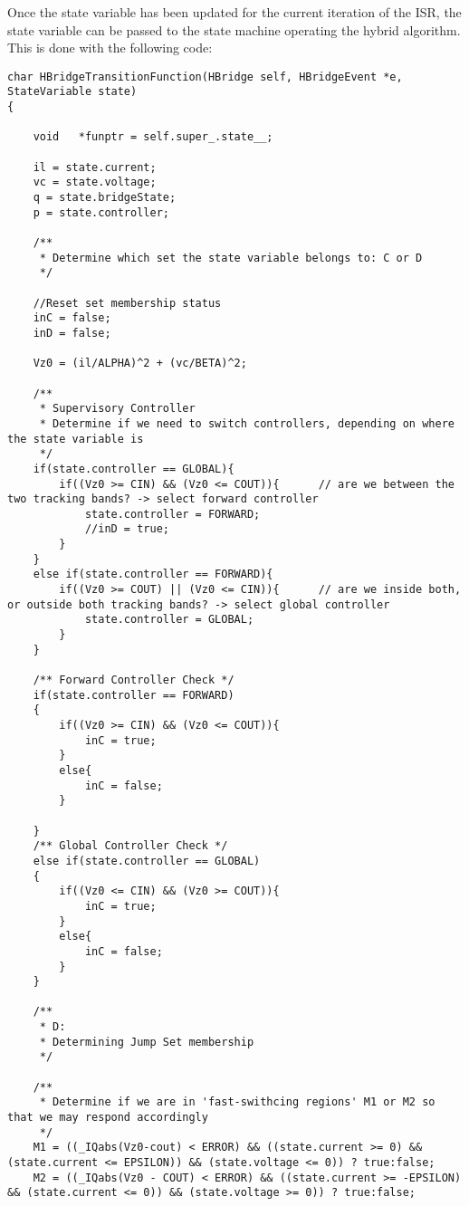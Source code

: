 Once the state variable has been updated for the current iteration of the ISR, the state variable can be passed to the state machine operating the hybrid algorithm. This is done with the following code:

\begin{lstlisting}
char HBridgeTransitionFunction(HBridge self, HBridgeEvent *e, StateVariable state)
{

    void   *funptr = self.super_.state__;

    il = state.current;
    vc = state.voltage;
    q = state.bridgeState;
    p = state.controller;
    
    /**
     * Determine which set the state variable belongs to: C or D
     */
    
    //Reset set membership status
    inC = false;   
    inD = false;

    Vz0 = (il/ALPHA)^2 + (vc/BETA)^2;

    /**
     * Supervisory Controller 
     * Determine if we need to switch controllers, depending on where the state variable is
     */
    if(state.controller == GLOBAL){
        if((Vz0 >= CIN) && (Vz0 <= COUT)){      // are we between the two tracking bands? -> select forward controller
            state.controller = FORWARD;
            //inD = true;
        }
    }
    else if(state.controller == FORWARD){
        if((Vz0 >= COUT) || (Vz0 <= CIN)){      // are we inside both, or outside both tracking bands? -> select global controller
            state.controller = GLOBAL;
        }
    }

    /** Forward Controller Check */
    if(state.controller == FORWARD)           
    {      
        if((Vz0 >= CIN) && (Vz0 <= COUT)){
            inC = true;
        }
        else{
            inC = false;            
        }

    }
    /** Global Controller Check */
    else if(state.controller == GLOBAL)   
    {     
        if((Vz0 <= CIN) && (Vz0 >= COUT)){
            inC = true;
        }
        else{
            inC = false;            
        }
    }

    /**
     * D:
     * Determining Jump Set membership
     */
    
    /**
     * Determine if we are in 'fast-swithcing regions' M1 or M2 so that we may respond accordingly
     */
    M1 = ((_IQabs(Vz0-cout) < ERROR) && ((state.current >= 0) && (state.current <= EPSILON)) && (state.voltage <= 0)) ? true:false;
    M2 = ((_IQabs(Vz0 - COUT) < ERROR) && ((state.current >= -EPSILON) && (state.current <= 0)) && (state.voltage >= 0)) ? true:false;


\end{lstlisting}
